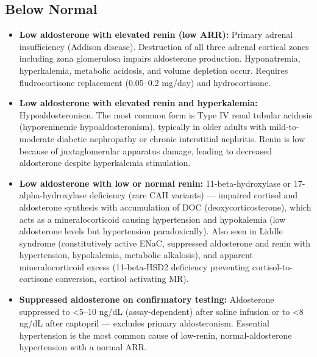 \subsection*{Below Normal}
\begin{itemize}
  \item \textbf{Low aldosterone with elevated renin (low ARR):} Primary adrenal insufficiency (Addison disease). Destruction of all three adrenal cortical zones including zona glomerulosa impairs aldosterone production. Hyponatremia, hyperkalemia, metabolic acidosis, and volume depletion occur. Requires fludrocortisone replacement (0.05--0.2 mg/day) and hydrocortisone.
  \item \textbf{Low aldosterone with elevated renin and hyperkalemia:} Hypoaldosteronism. The most common form is Type IV renal tubular acidosis (hyporeninemic hypoaldosteronism), typically in older adults with mild-to-moderate diabetic nephropathy or chronic interstitial nephritis. Renin is low because of juxtaglomerular apparatus damage, leading to decreased aldosterone despite hyperkalemia stimulation.
  \item \textbf{Low aldosterone with low or normal renin:} 11-beta-hydroxylase or 17-alpha-hydroxylase deficiency (rare CAH variants) --- impaired cortisol and aldosterone synthesis with accumulation of DOC (deoxycorticosterone), which acts as a mineralocorticoid causing hypertension and hypokalemia (low aldosterone levels but hypertension paradoxically). Also seen in Liddle syndrome (constitutively active ENaC, suppressed aldosterone and renin with hypertension, hypokalemia, metabolic alkalosis), and apparent mineralocorticoid excess (11-beta-HSD2 deficiency preventing cortisol-to-cortisone conversion, cortisol activating MR).
  \item \textbf{Suppressed aldosterone on confirmatory testing:} Aldosterone suppressed to <5--10 ng/dL (assay-dependent) after saline infusion or to <8 ng/dL after captopril --- excludes primary aldosteronism. Essential hypertension is the most common cause of low-renin, normal-aldosterone hypertension with a normal ARR.
\end{itemize}

